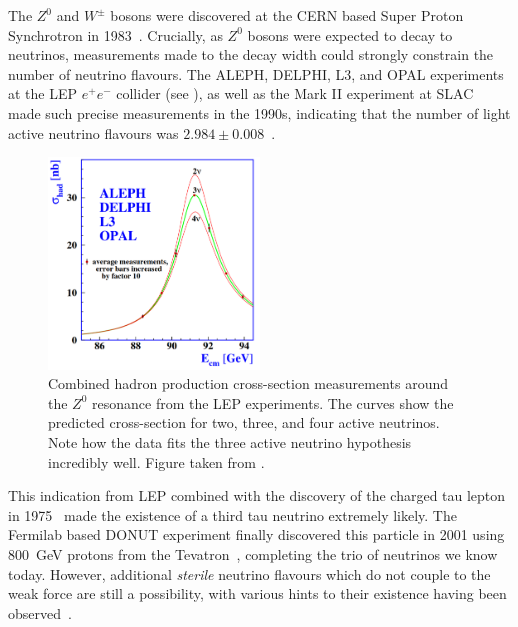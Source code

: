 The $Z^{0}$ and $W^{\pm}$ bosons were discovered at the CERN based Super Proton Synchrotron in
1983~\cite{arnison1983_z, arnison1983_w}. Crucially, as $Z^{0}$ bosons were expected to decay to
neutrinos, measurements made to the decay width could strongly constrain the number of neutrino
flavours. The ALEPH, DELPHI, L3, and OPAL experiments at the LEP $e^{+}e^{-}$ collider (see
), as well as the Mark II experiment at SLAC~\cite{abrams1989} made
such precise measurements in the 1990s, indicating that the number of light active neutrino
flavours was $2.984\pm0.008$~\cite{electroweak2006}.

\begin{figure} %
    \includegraphics[origin=c,width=0.5\textwidth]{diagrams/3-theory/z_resonance.pdf}
    \caption[Hadron production cross-section measurements from LEP]
    {Combined hadron production cross-section measurements around the $Z^{0}$ resonance from the
        LEP experiments. The curves show the predicted cross-section for two, three, and four
        active neutrinos. Note how the data fits the three active neutrino hypothesis incredibly
        well. Figure taken from .}
    \label{fig:z_resonance}
\end{figure}

This indication from LEP combined with the discovery of the charged tau lepton in
1975~\cite{perl1975} made the existence of a third tau neutrino extremely likely. The Fermilab
based DONUT experiment finally discovered this particle in 2001 using \SI{800}{\GeV} protons from
the Tevatron~\cite{Kodama2001}, completing the trio of neutrinos we know today. However,
additional \emph{sterile} neutrino flavours which do not couple to the weak force are still a
possibility, with various hints to their existence having been observed~\cite{particle2020}.

